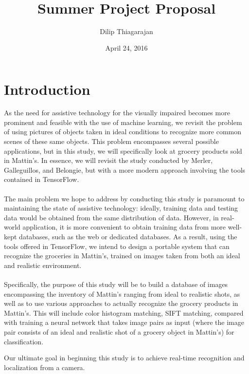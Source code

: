 \documentclass{article}
\title{Summer Project Proposal}
\author{Dilip Thiagarajan}
\date{April 24, 2016}
\begin{document}
\maketitle
\section{Introduction}
As the need for assistive technology for the visually impaired becomes more prominent and feasible with the use of machine learning, we revisit the problem of using pictures of objects taken in ideal conditions to recognize more common scenes of these same objects. This problem encompasses several possible applications, but in this study, we will specifically look at grocery products sold in Mattin's. In essence, we will revisit the study conducted by Merler, Galleguillos, and Belongie, but with a more modern approach involving the tools contained in TensorFlow. 
\\ \\
The main problem we hope to address by conducting this study is paramount to maintaining the state of assistive technology: ideally, training data and testing data would be obtained from the same distribution of data. However, in real-world application, it is more convenient to obtain training data from more well-kept databases, such as the web or dedicated databases. As a result, using the tools offered in TensorFlow, we intend to design a portable system that can recognize the groceries in Mattin's, trained on images taken from both an ideal and realistic environment.
\\ \\
Specifically, the purpose of this study will be to build a database of images encompassing the inventory of Mattin's ranging from ideal to realistic shots, as well as to use various approaches to actually recognize the grocery products in Mattin's. This will include color histogram matching, SIFT matching, compared with training a neural network that takes image pairs as input (where the image pair consists of an ideal and realistic shot of a grocery object in Mattin's) for classification.

Our ultimate goal in beginning this study is to achieve real-time recognition and localization from a camera. 
\end{document}
